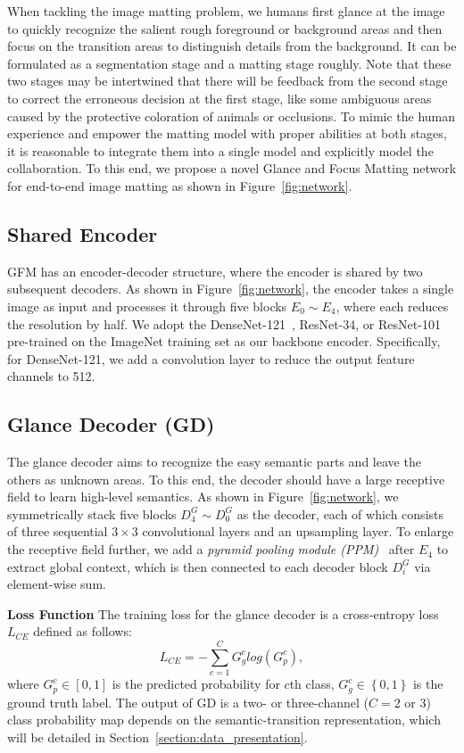\documentclass[twocolumn]{svjour3}
\begin{document}
When tackling the image matting problem, we humans first glance at the image to quickly recognize the salient rough foreground or background areas and then focus on the transition areas to distinguish details from the background. It can be formulated as a segmentation stage and a matting stage roughly. Note that these two stages may be intertwined that there will be feedback from the second stage to correct the erroneous decision at the first stage, like some ambiguous areas caused by the protective coloration of animals or occlusions. To mimic the human experience and empower the matting model with proper abilities at both stages, it is reasonable to integrate them into a single model and explicitly model the collaboration. To this end, we propose a novel Glance and Focus Matting network for end-to-end image matting as shown in Figure~\ref{fig:network}.

\subsection{Shared Encoder}
GFM has an encoder-decoder structure, where the encoder is shared by two subsequent decoders. As shown in Figure~\ref{fig:network}, the encoder takes a single image as input and processes it through five blocks $E_0\sim E_4$, where each reduces the resolution by half. We adopt the DenseNet-121~\citep{huang2017densely}, ResNet-34, or ResNet-101~\citep{he2016deep} pre-trained on the ImageNet training set as our backbone encoder. Specifically, for DenseNet-121, we add a convolution layer to reduce the output feature channels to 512.

\subsection{Glance Decoder (GD)}
The glance decoder aims to recognize the easy semantic parts and leave the others as unknown areas. To this end, the decoder should have a large receptive field to learn high-level semantics. As shown in Figure~\ref{fig:network}, we symmetrically stack five blocks $D^G_4 \sim D^G_0$ as the decoder, each of which consists of three sequential $3\times3$ convolutional layers and an upsampling layer. To enlarge the receptive field further, we add a \textit{pyramid pooling module (PPM)}~\citep{zhao2017pyramid,Liu2019PoolSal} after $E_4$ to extract global context, which is then connected to each decoder block $D^G_i$ via element-wise sum. 

\textbf{Loss Function} The training loss for the glance decoder is a cross-entropy loss $L_{CE}$ defined as follows:
\begin{equation}
L_{CE} = -\sum_{c=1}^{C}{G_g^c}log\left(G_p^c\right),
\label{equa:ce_loss}
\end{equation}
where $G_p^c \in \left[0,1\right]$ is the predicted probability for $c$th class, $G_g^c \in \left\{0,1\right\}$ is the ground truth label. The output of GD is a two- or three-channel ($C=2$ or $3$) class probability map depends on the semantic-transition representation, which will be detailed in Section~\ref{section:data_presentation}.
\end{document}
